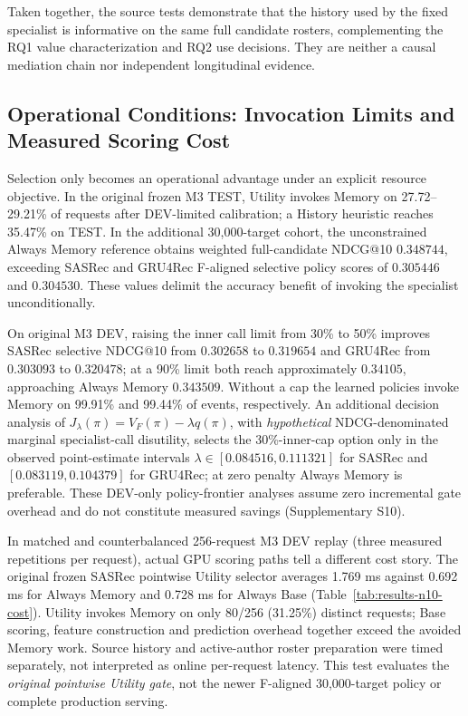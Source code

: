 Taken together, the source tests demonstrate that the history used by the fixed specialist is informative on the same full candidate rosters, complementing the RQ1 value characterization and RQ2 use decisions. They are neither a causal mediation chain nor independent longitudinal evidence.

\FloatBarrier
\subsection{Operational Conditions: Invocation Limits and Measured Scoring Cost}
\label{sec:results-efficiency}

Selection only becomes an operational advantage under an explicit resource objective. In the original frozen M3 TEST, Utility invokes Memory on 27.72--29.21\% of requests after DEV-limited calibration; a History heuristic reaches 35.47\% on TEST. In the additional 30,000-target cohort, the unconstrained Always Memory reference obtains weighted full-candidate NDCG@10 $0.348744$, exceeding SASRec and GRU4Rec F-aligned selective policy scores of $0.305446$ and $0.304530$. These values delimit the accuracy benefit of invoking the specialist unconditionally.

On original M3 DEV, raising the inner call limit from 30\% to 50\% improves SASRec selective NDCG@10 from $0.302658$ to $0.319654$ and GRU4Rec from $0.303093$ to $0.320478$; at a 90\% limit both reach approximately $0.34105$, approaching Always Memory $0.343509$. Without a cap the learned policies invoke Memory on 99.91\% and 99.44\% of events, respectively. An additional decision analysis of $J_\lambda(\pi)=V_F(\pi)-\lambda q(\pi)$, with \emph{hypothetical} NDCG-denominated marginal specialist-call disutility, selects the 30\%-inner-cap option only in the observed point-estimate intervals $\lambda\in[0.084516,0.111321]$ for SASRec and $[0.083119,0.104379]$ for GRU4Rec; at zero penalty Always Memory is preferable. These DEV-only policy-frontier analyses assume zero incremental gate overhead and do not constitute measured savings (Supplementary S10).

In matched and counterbalanced 256-request M3 DEV replay (three measured repetitions per request), actual GPU scoring paths tell a different cost story. The original frozen SASRec pointwise Utility selector averages 1.769 ms against 0.692 ms for Always Memory and 0.728 ms for Always Base (Table~\ref{tab:results-n10-cost}). Utility invokes Memory on only 80/256 (31.25\%) distinct requests; Base scoring, feature construction and prediction overhead together exceed the avoided Memory work. Source history and active-author roster preparation were timed separately, not interpreted as online per-request latency. This test evaluates the \emph{original pointwise Utility gate}, not the newer F-aligned 30,000-target policy or complete production serving.


